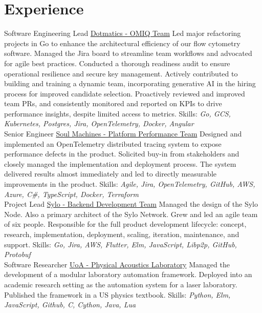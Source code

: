 \documentclass[a4paper]{twentysecondcv}
\begin{document}
\makeprofile{}

\section{Experience}
\begin{twenty}
    {}
    {Software Engineering Lead}
    {\href{https://www.dotmatics.com/}{Dotmatics - OMIQ Team}}
    {}
    {Led major refactoring projects in Go to enhance the architectural
    efficiency of our flow cytometry software. Managed the Jira board to
    streamline team workflows and advocated for agile best practices. Conducted
    a thorough readiness audit to ensure operational resilience and secure key
    management. Actively contributed to building and training a dynamic team,
    incorporating generative AI in the hiring process for improved candidate
    selection. Proactively reviewed and improved team PRs, and consistently
    monitored and reported on KPIs to drive performance insights, despite
    limited access to metrics.
    Skills: \emph{Go, GCS, Kubernetes, Postgres, Jira, OpenTelemetry,
    Docker, Angular}} \\

    {}
    {Senior Engineer}
    {\href{https://www.soulmachines.com/}{Soul Machines - Platform Performance Team}}
    {}
    {Designed and implemented an OpenTelemetry distributed tracing system to
    expose performance defects in the product. Solicited buy-in from
    stakeholders and closely managed the implementation and deployment process.
    The system delivered results almost immediately and led to directly
    measurable improvements in the product.
    Skills: \emph{Agile, Jira, OpenTelemetry, GitHub, AWS, Azure, C\#,
    TypeScript, Docker, Terraform}} \\

    {}
    {Project Lead}
    {\href{https://sylo.io/}{Sylo - Backend Development Team}}
    {}
    {Managed the design of the Sylo Node. Also a primary architect of the Sylo
    Network. Grew and led an agile team of six people. Responsible for the full
    product development lifecycle: concept, research, implementation,
    deployment, scaling, iteration, maintenance, and support.
    Skills: \emph{Go, Jira, AWS, Flutter, Elm, JavaScript, Libp2p, GitHub,
    Protobuf}} \\

    {}
    {Software Researcher}
    {\href{https://pal.auckland.ac.nz/}{UoA - Physical Acoustics Laboratory}}
    {}
    {Managed the development of a modular laboratory automation framework.
    Deployed into an academic research setting as the automation system for a
    laser laboratory. Published the framework in a US physics textbook.
    Skills: \emph{Python, Elm, JavaScript, Github, C, Cython, Java, Lua}} \\

\end{twenty}
\end{document}
